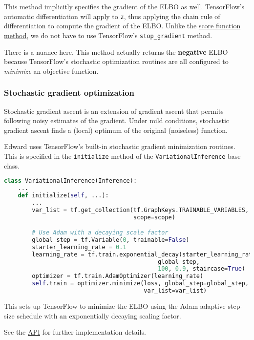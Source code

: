 This method implicitly specifies the gradient of the ELBO as well. TensorFlow's
automatic differentiation will apply to \texttt{z}, thus applying the chain rule
of differentiation to compute the gradient of the ELBO. Unlike the
\href{tut_KLqp_score.html}{score function method},
we do not have to use TensorFlow's \texttt{stop_gradient} method.

There is a nuance here. This method actually returns the \textbf{negative} ELBO
because TensorFlow's stochastic optimization routines are all configured to
\emph {minimize} an objective function.

\subsubsection{Stochastic gradient optimization}

Stochastic gradient ascent is an extension of gradient ascent that permits
following noisy estimates of the gradient. Under mild conditions, stochastic
gradient ascent finds a (local) optimum of the original (noiseless) function.

Edward uses TensorFlow's built-in stochastic gradient minimization routines.
This is specified in the \texttt{initialize} method of the 
\texttt{VariationalInference} base class.

\begin{lstlisting}[language=Python]
class VariationalInference(Inference):
    ...
    def initialize(self, ...):
        ...
        var_list = tf.get_collection(tf.GraphKeys.TRAINABLE_VARIABLES,
                                     scope=scope)

        # Use Adam with a decaying scale factor
        global_step = tf.Variable(0, trainable=False)
        starter_learning_rate = 0.1
        learning_rate = tf.train.exponential_decay(starter_learning_rate,
                                            global_step,
                                            100, 0.9, staircase=True)
        optimizer = tf.train.AdamOptimizer(learning_rate)
        self.train = optimizer.minimize(loss, global_step=global_step,
                                        var_list=var_list)
\end{lstlisting}

This sets up TensorFlow to minimize the ELBO using the Adam adaptive step-size
schedule with an exponentially decaying scaling factor.

See the \href{api/index.html}{API} for further implementation details.
